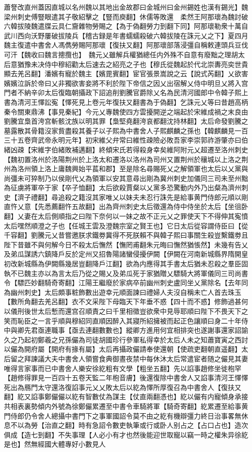 蕭詧改直州蓋因直城以名州魏以其地出金故郡曰金城州曰金州錫姓也漢有錫光】魏梁州刺史傅豎眼遣其子敬紹擊之【豎而庾翻】休儒等敗還　柔然王阿那瓌為魏討破六韓拔陵魏遣牒云具仁齎雜物勞賜之【為于偽翻勞力到翻下同】阿那瓌勒衆十萬自武川西向沃野屢破拔陵兵【稽古録是年書蠕蠕殺破六韓拔陵在誅元乂之下】夏四月魏主復遣中書舍人馮儁勞賜阿那瓌【復扶又翻】阿那瓌部落浸彊自稱敕連頭兵豆伐可汗【魏收曰魏言摠攬也】　魏元乂雖解兵權猶總任内外殊不自意有廢黜之理胡太后意猶豫未决侍中穆紹勸太后速去之紹亮之子也【穆氏從魏起於代北崇夀亮奕世貴顯去羌呂翻】潘嬪有寵於魏主【嬪毘賓翻】宦官張景嵩說之云【說式芮翻】乂欲害嬪嬪泣訴於帝曰乂非獨欲害妾將不利於陛下帝信之因乂出宿解乂侍中明旦乂將入宫門者不納辛卯太后復臨朝攝政下詔追削劉騰官爵除乂名為民清河國郎中令韓子熙上書為清河王懌訟寃【懌死見上卷元年復扶又翻書為于偽翻】乞誅元乂等曰昔趙高柄秦令關東鼎沸【事見秦紀】今元乂專魏使四方雲擾開逆之端起於宋維成禍之末良由劉騰宜梟首洿宫斬骸沈族以明其罪【梟堅堯翻洿哀都翻沈持林翻】太后命發劉騰之墓露散其骨籍沒家貲盡殺其養子以子熙為中書舍人子熙麒麟之孫也【韓麒麟見一百三十五卷齊武帝永明元年】初宋維父弁常曰維性疎險必敗吾家李崇郭祚游肇亦曰伯緒凶疎【宋維字伯緒敗補邁翻】終傾宋氏若得殺身幸矣維阿附元乂超遷至洛州刺史【魏初置洛州於洛陽荆州於上洛太和遷洛以洛州為司州又置荆州於穰城以上洛之荆州為洛州領上洛上庸魏興始平萇和郡】至是除名尋賜死乂之解領軍也太后以乂黨與尚彊未可猝制乃以侯剛代乂為領軍以安其意尋出剛為冀州刺史加儀同三司未至州黜為征虜將軍卒于家【卒子恤翻】太后欲殺賈粲以乂黨多恐驚動内外乃出粲為濟州刺史【濟子禮翻】尋追殺之籍沒其家唯乂以妹夫未忍行誅先是給事黄門侍郎元順以剛直忤乂意【先悉薦翻忤五故翻】出為齊州刺史太后徵還為侍中侍坐於太后【坐徂卧翻】乂妻在太后側順指之曰陛下奈何以一妹之故不正元乂之罪使天下不得伸其寃憤太后嘿然順澄之子也【任城王雲及澄魏宗室之賢王也】它日太后從容謂侍臣曰【從千容翻】劉騰元乂昔嘗邀朕求鐵劵冀得不死朕賴不與韓子熙曰事關生殺豈繫鐵劵且陛下昔雖不與何解今日不殺太后憮然【憮罔甫翻朱元晦曰憮然猶悵然】未幾有告乂及弟瓜謀誘六鎮降戶反於定州又招魯陽諸蠻侵擾伊闕【伊闕在河南新城縣界隋開皇初改新城縣為伊闕縣幾居豈翻降戶江翻】欲為内應得其手書太后猶未忍殺之羣臣固執不已魏主亦以為言太后乃從之賜乂及弟瓜死于家猶贈乂驃騎大將軍儀同三司尚書令【驃匹妙翻騎奇寄翻】江陽王繼廢於家病卒前幽州刺史盧同坐乂黨除名【去年同為幽州刺史】太后頗事粧飾數出遊幸元順面諫曰禮婦人夫沒自稱未亡人首去珠玉【數所角翻去羌呂翻】衣不文采陛下母臨天下年垂不惑【四十而不惑】修飾過甚何以儀刑後世太后慙而還宫召順責之曰千里相徵豈欲衆中見辱耶順曰陛下不畏天下之笑而恥臣之一言乎順與穆紹同直順因醉入其寢所紹擁被而起正色讓順曰身二十年侍中與卿先君亟連職事【亟去連翻數數也】縱卿方進用何宜相排突也遂謝事還家詔諭久之乃起初鄭羲之兄孫儼為司徒胡國珍行參軍私得幸於太后人未之知蕭寶寅之西討以儼為開府屬【開府有掾有屬】太后再攝政儼請奉使還朝【使疏吏翻朝直遥翻】太后留之拜諫議大夫中書舍人領嘗食典御晝夜禁中每休沐太后常遣宦者随之儼見其妻唯得言家事而已中書舍人樂安徐紇粗有文學【粗坐五翻】先以諂事趙修坐徙枹罕【趙修得罪見一百四十五卷天監二年枹音膚】後還復除中書舍人又諂事清河王懌懌死出為鴈門太守還洛復諂事元乂乂敗太后以紇為懌所厚復召為中書舍人【復扶又翻】紇又諂事鄭儼儼以紇有智數仗為謀主【仗直兩翻憑也】紇以儼有内寵傾身承接共相表裏勢傾内外號為徐鄭儼累遷至中書令車騎將軍【騎奇寄翻】紇累遷至給事黄門侍郎仍令舍人總攝中書門下之事軍國詔令莫不由之紇有機辯彊力終日治事畧無休息不以為勞【治直之翻】時有急詔令數吏執筆或行或卧人别占之【占口占也】造次俱成【造七到翻】不失事理【人必小有才也然後能迎世取寵以竊一時之權朱异徐紇是也】然無經國大體專好小數見人